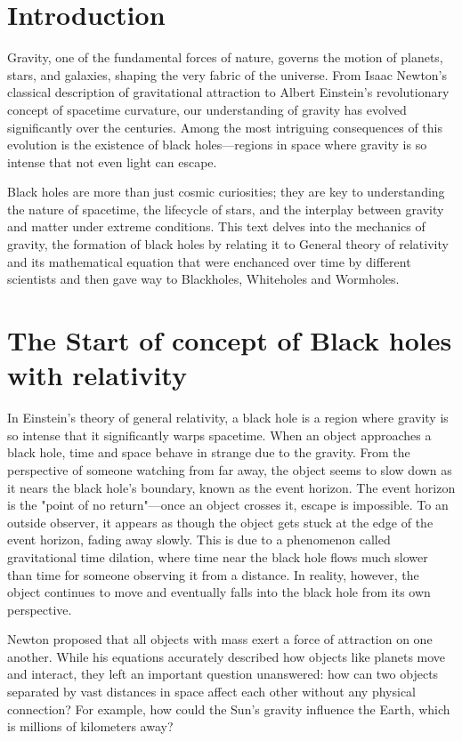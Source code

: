 \documentclass[12pt,a4paper]{article}
\begin{document}
\tableofcontents

\newpage

\section{Introduction}
Gravity, one of the fundamental forces of nature, governs the motion of planets, stars, and galaxies, shaping the very fabric of the universe. From Isaac Newton’s classical description of gravitational attraction to Albert Einstein’s revolutionary concept of spacetime curvature, our understanding of gravity has evolved significantly over the centuries. Among the most intriguing consequences of this evolution is the existence of black holes—regions in space where gravity is so intense that not even light can escape.


Black holes are more than just cosmic curiosities; they are key to understanding the nature of spacetime, the lifecycle of stars, and the interplay between gravity and matter under extreme conditions. This text delves into the mechanics of gravity, the formation of black holes by relating it to General theory of relativity and its mathematical equation that were enchanced over time by different scientists and then gave way to Blackholes, Whiteholes and Wormholes.

\section{The Start of concept of Black holes with relativity}
In Einstein's theory of general relativity, a black hole is a region where gravity is so intense that it significantly warps spacetime. When an object approaches a black hole, time and space behave in strange due to the gravity. From the perspective of someone watching from far away, the object seems to slow down as it nears the black hole’s boundary, known as the event horizon. The event horizon is the "point of no return"—once an object crosses it, escape is impossible. To an outside observer, it appears as though the object gets stuck at the edge of the event horizon, fading away slowly. This is due to a phenomenon called gravitational time dilation, where time near the black hole flows much slower than time for someone observing it from a distance. In reality, however, the object continues to move and eventually falls into the black hole from its own perspective.

Newton proposed that all objects with mass exert a force of attraction on one another. While his equations accurately described how objects like planets move and interact, they left an important question unanswered: how can two objects separated by vast distances in space affect each other without any physical connection? For example, how could the Sun's gravity influence the Earth, which is millions of kilometers away?
\end{document}
